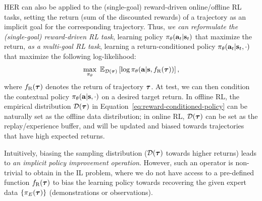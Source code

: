 HER can also be applied to the (single-goal) reward-driven online/offline RL tasks, setting the return (sum of the discounted rewards) of a trajectory as an implicit goal for the corresponding trajectory. 
Thus, \textit{we can reformulate the (single-goal) reward-driven RL task}, learning policy $\pi_\theta(\mathbf{a}_t|\mathbf{s}_t)$ that maximize the return, \textit{as a multi-goal RL task}, learning a return-conditioned policy $\pi_\theta(\mathbf{a}_t|\mathbf{s}_t, \cdot)$ that maximize the following log-likelihood: 
\begin{align}\label{eq:reward-conditioned-policy}
	\max_{\pi_\theta} \ \mathbb{E}_{\mathcal{D}({\bm{\tau}})} \left[ \log \pi_\theta(\mathbf{a}|\mathbf{s}, {f_\text{R}}({\bm{\tau}})) \right],
\end{align}
where ${f_\text{R}}({\bm{\tau}})$ denotes the return of trajectory ${\bm{\tau}}$. At test, we can then condition the contextual policy $\pi_\theta(\mathbf{a}|\mathbf{s}, \cdot)$ on a desired target return. 
In offline RL, the empirical distribution $\mathcal{D}({\bm{\tau}})$ in Equation~\ref{eq:reward-conditioned-policy} can be naturally set as the offline data distribution; in online RL, $\mathcal{D}({\bm{\tau}})$ can be set as the replay/experience buffer, and will be updated and biased towards trajectories that have high expected returns. 


Intuitively, biasing the sampling distribution ($\mathcal{D}({\bm{\tau}})$ towards higher returns) leads to \textit{an implicit policy improvement operation}. However, such an operator is non-trivial to obtain in the IL problem, where we do not have access to a pre-defined function ${f_\text{R}}({\bm{\tau}})$ to bias the learning policy towards recovering the given expert data $\{\pi_E({\bm{\tau}})\}$ (demonstrations or observations). 

